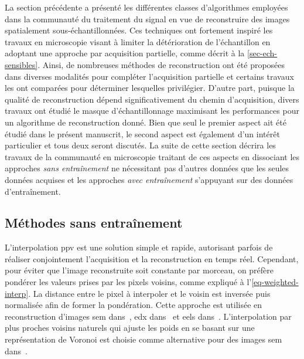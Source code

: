 La section précédente a présenté les différentes classes d'algorithmes employées dans la communauté du traitement du signal en vue de reconstruire des images spatialement sous-échantillonnées. Ces techniques ont fortement inspiré les travaux en microscopie visant à limiter la détérioration de l'échantillon en adoptant une approche par acquisition partielle, comme décrit à la \cref{sec-ech-sensibles}.
%
Ainsi, de nombreuses méthodes de reconstruction ont été proposées dans diverses modalités pour compléter l'acquisition partielle et certains travaux les ont comparées pour déterminer lesquelles privilégier.
%
D'autre part, puisque la qualité de reconstruction dépend significativement du chemin d'acquisition, divers travaux ont étudié le masque d'échantillonnage maximisant les performances pour un algorithme de reconstruction donné. Bien que seul le premier aspect ait été étudié dans le présent manuscrit, le second aspect est également d'un intérêt particulier et tous deux seront discutés.
%
La suite de cette section décrira les travaux de la communauté en microscopie traitant de ces aspects en dissociant les approches \emph{sans entraînement} ne nécessitant pas d'autres données que les seules données acquises et les approches \emph{avec entraînement} s'appuyant sur des données d'entraînement.

\subsection{Méthodes sans entraînement}

L'interpolation \gls{ppv} est une solution simple et rapide, autorisant parfois de réaliser conjointement l'acquisition et la reconstruction en temps réel. Cependant, pour éviter que l'image reconstruite soit constante par morceau, on préfère pondérer les valeurs prises par les pixels voisins, comme expliqué à l'\cref{eq-weighted-interp}. La distance entre le pixel à interpoler et le voisin est inversée puis normalisée afin de former la pondération. Cette approche est utilisée en reconstruction d'images \gls{sem} dans~\cite{godaliyadda2018tci}, \gls{edx} dans~\cite{zhang2018reduced, hujsak2018high} et \gls{eels} dans~\cite{hujsak2018high}. L'interpolation par plus proches voisins naturels qui ajuste les poids en se basant sur une représentation de Voronoi est choisie comme alternative pour des images \gls{sem} dans~\cite{trampert2018ultramicroscopy}.

